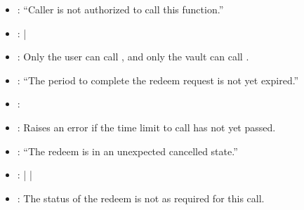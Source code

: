 \documentclass[a4paper,10pt,english]{sphinxmanual}
\begin{document}
\begin{itemize}
\item {} 
: “Caller is not authorized to call this function.”

\item {} 
: {\hyperref[\detokenize{spec/redeem:cancelredeem}]{}} | {\hyperref[\detokenize{spec/redeem:minttokensforreimbursedredeem}]{}}

\item {} 
: Only the user can call {\hyperref[\detokenize{spec/redeem:cancelredeem}]{}}, and only the vault can call {\hyperref[\detokenize{spec/redeem:minttokensforreimbursedredeem}]{}}.

\end{itemize}

\begin{itemize}
\item {} 
: “The period to complete the redeem request is not yet expired.”

\item {} 
: {\hyperref[\detokenize{spec/redeem:cancelredeem}]{}}

\item {} 
:  Raises an error if the time limit to call  has not yet passed.

\end{itemize}

\begin{itemize}
\item {} 
: “The redeem is in an unexpected cancelled state.”

\item {} 
: {\hyperref[\detokenize{spec/redeem:cancelredeem}]{}} | {\hyperref[\detokenize{spec/redeem:minttokensforreimbursedredeem}]{}} | {\hyperref[\detokenize{spec/redeem:executeredeem}]{}}

\item {} 
:  The status of the redeem is not as required for this call.

\end{itemize}
\end{document}
